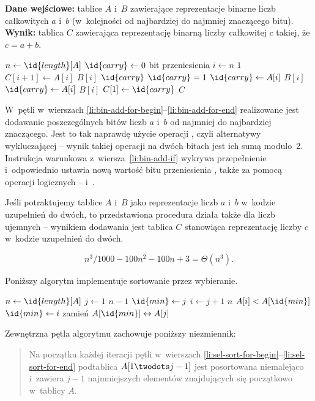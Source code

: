 \exercise{} %
\textbf{Dane wejściowe:}  tablice $A$ i~$B$ zawierające reprezentacje binarne  liczb całkowitych $a$ i~$b$ (w~kolejności od najbardziej do najmniej znaczącego bitu). \\
\textbf{Wynik:}  tablica $C$ zawierająca reprezentację binarną  liczby całkowitej $c$ takiej, że $c=a+b$.
\begin{codebox}
\li	$n\gets\id{length}[A]$
\li	$\id{carry}\gets0$ \>\>\>\>\Comment bit przeniesienia
\li	\For $i\gets n$ \Downto $1$ \label{li:bin-add-for-begin}
\li		\Do
			$C[i+1]\gets A[i]$ \kw{xor} $B[i]$  $\id{carry}$ \label{li:bin-add-xor}
\li			\If $\id{carry}=1$ \label{li:bin-add-if}
\li				\Then
					$\id{carry}\gets A[i]$  $B[i]$
\li				\Else
					$\id{carry}\gets A[i]$  $B[i]$
				\End
		\End \label{li:bin-add-for-end}
\li	$C[1]\gets\id{carry}$
\li	\Return $C$
\end{codebox}

W~pętli  w~wierszach \ref{li:bin-add-for-begin}\nobreakdash--\ref{li:bin-add-for-end} realizowane jest dodawanie poszczególnych bitów liczb $a$ i~$b$ od najmniej do najbardziej znaczącego. Jest to tak naprawdę użycie operacji , czyli alternatywy wykluczającej -- wynik takiej operacji na dwóch bitach jest ich sumą modulo~2. Instrukcja warunkowa z~wiersza~\ref{li:bin-add-if} wykrywa przepełnienie i~odpowiednio ustawia nową wartość bitu przeniesienia , także za pomocą operacji logicznych --  i~.

Jeśli potraktujemy tablice $A$ i~$B$ jako reprezentacje liczb $a$ i~$b$ w~kodzie uzupełnień do dwóch, to przedstawiona procedura działa także dla liczb ujemnych -- wynikiem dodawania jest tablica $C$ stanowiąca reprezentację liczby $c$ w~kodzie uzupełnień do dwóch.


\exercise{} %
\[
	n^3\!/1000-100n^2-100n+3 = \Theta(n^3).
\]

\exercise{} %
Poniższy algorytm implementuje sortowanie przez wybieranie.
\begin{codebox}
\li	$n\gets\id{length}[A]$
\li	\For $j\gets1$ \To $n-1$ \label{li:sel-sort-for-begin}
\li		\Do
			$\id{min}\gets j$
\li			\For $i\gets j+1$ \To $n$
\li				\Do
					\If $A[i]<A[\id{min}]$
\li						\Then
							$\id{min}\gets i$
						\End
				\End
\li			zamień $A[\id{min}]\leftrightarrow A[j]$
		\End \label{li:sel-sort-for-end}
\end{codebox}
Zewnętrzna pętla algorytmu zachowuje poniższy niezmiennik:
\begin{quote}
Na początku każdej iteracji pętli  w~wierszach \ref{li:sel-sort-for-begin}\nobreakdash--\ref{li:sel-sort-for-end} podtablica $A[1\twodots j-1]$ jest posortowana niemalejąco i~zawiera $j-1$ najmniejszych elementów znajdujących się początkowo w~tablicy $A$.
\end{quote}

